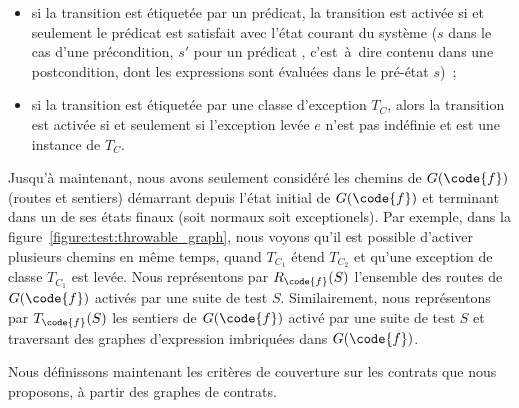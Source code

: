 \begin{itemize}
\item si la transition est étiquetée par un prédicat, la transition est activée
si et seulement le prédicat est satisfait avec l'état courant du système ($s$
dans le cas d'une précondition, $s'$ pour un prédicat ,
c'est~à~dire contenu dans une postcondition, dont les expressions \aold{\empty}
sont évaluées dans le pré-état $s$)~;

\item si la transition est étiquetée par une classe d'exception $T_C$, alors la
transition est activée si et seulement si l'exception levée $e$ n'est pas
indéfinie et est une instance de $T_C$.

\end{itemize}

Jusqu'à maintenant, nous avons seulement considéré les chemins de $G(\code{f})$
(routes et sentiers) démarrant depuis l'état initial de $G(\code{f})$ et
terminant dans un de ses états finaux (soit normaux soit exceptionels). Par
exemple, dans la figure~\ref{figure:test:throwable_graph}, nous voyons qu'il est
possible d'activer plusieurs chemins en même temps, quand $T_{C_1}$ étend
$T_{C_2}$ et qu'une exception de classe $T_{C_1}$ est levée. Nous représentons
par $R_\code{f}(S)$ l'ensemble des routes de $G(\code{f})$ activés par une suite
de test $S$. Similairement, nous représentons par $T_\code{f}(S)$ les sentiers
de $G(\code{f})$ activé par une suite de test $S$ et traversant des graphes
d'expression imbriquées dans $G(\code{f})$.

Nous définissons maintenant les critères de couverture sur les contrats que nous
proposons, à partir des graphes de contrats.

